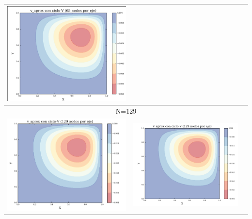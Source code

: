 \documentclass[letter,10pt]{article}
\begin{document}
\begin{table}[H]
\begin{tabular}[t]{|c|c|c|}
\includegraphics[scale=0.30]{img/v_cvRBGS65Ninjection} \\ \hline
\multicolumn{3}{|c|}{N=129} \\ \hline
\includegraphics[scale=0.34]{img/v_cvjacobi129Ninjection}&
\includegraphics[scale=0.34]{img/v_cvGS129Ninjection}&

\end{tabular}
\end{table}
\end{document}
